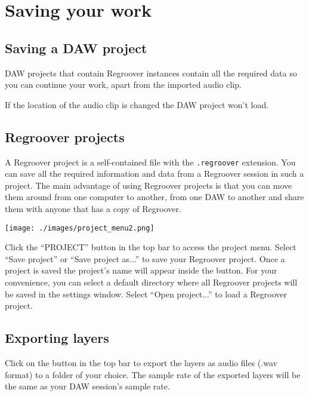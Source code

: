 \documentclass[12pt]{article}
\newcommand{\textimage}[3]{
\raisebox{#1}{\texttt{[image: \#3]}}
}
\begin{document}
\section*{Saving your work}
\subsection*{Saving a DAW project}
DAW projects that contain Regroover instances contain all the required data so you can continue your work, apart from the imported audio clip. 
\begin{mdframed}[style = warning]
If the location of the audio clip is changed the DAW project won't load.
\end{mdframed}

\subsection*{Regroover projects}
A Regroover project is a self-contained file with the \texttt{.regroover} extension. You can save all the required information and data from a Regroover session in such a project. The main advantage of using Regroover projects is that you can move them around from one computer to another, from one DAW to another and share them with anyone that has a copy of Regroover.
\begin{center}
\texttt{[image: ./images/project\_menu2.png]}
\end{center}
Click the ``PROJECT'' button in the top bar to access the project menu. Select ``Save project'' or ``Save project as...'' to save your Regroover project. Once a project is saved the project's name will appear inside the button. For your convenience, you can select a default directory where all Regroover projects will be saved in the settings window. Select ``Open project...'' to load a Regroover project. %

\subsection*{Exporting layers}
Click on the \textimage{-7pt}{0.8}{./images/export_button.png} button in the top bar to export the layers as audio files (.wav format) to a folder of your choice. The sample rate of the exported layers will be the same as your DAW session’s sample rate. 
\end{document}
